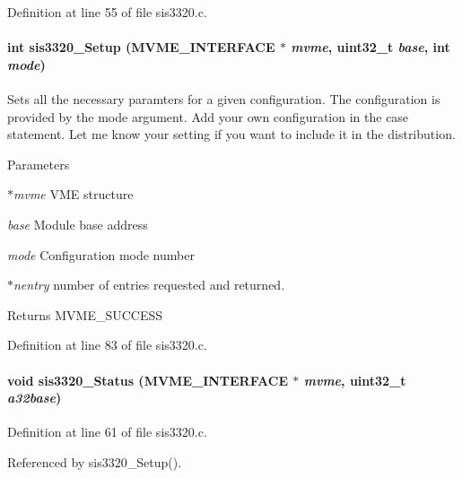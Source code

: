 Definition at line 55 of file sis3320.c.
\paragraph[{sis3320\_\-Setup}]{\setlength{\rightskip}{0pt plus 5cm}int sis3320\_\-Setup ({\bf MVME\_\-INTERFACE} $\ast$ {\em mvme}, \/  uint32\_\-t {\em base}, \/  int {\em mode})}\hfill\label{sis3320drv_8h_ae1163990f782e9844b925f28255c588e}
Sets all the necessary paramters for a given configuration. The configuration is provided by the mode argument. Add your own configuration in the case statement. Let me know your setting if you want to include it in the distribution. 
\begin{DoxyParams}{Parameters}
\item[{\em $\ast$mvme}]VME structure \item[{\em base}]Module base address \item[{\em mode}]Configuration mode number \item[{\em $\ast$nentry}]number of entries requested and returned. \end{DoxyParams}
\begin{DoxyReturn}{Returns}
MVME\_\-SUCCESS 
\end{DoxyReturn}


Definition at line 83 of file sis3320.c.
\paragraph[{sis3320\_\-Status}]{\setlength{\rightskip}{0pt plus 5cm}void sis3320\_\-Status ({\bf MVME\_\-INTERFACE} $\ast$ {\em mvme}, \/  uint32\_\-t {\em a32base})}\hfill\label{sis3320drv_8h_a524558d0685ff13c8ffffe3fa9024276}


Definition at line 61 of file sis3320.c.

Referenced by sis3320\_\-Setup().